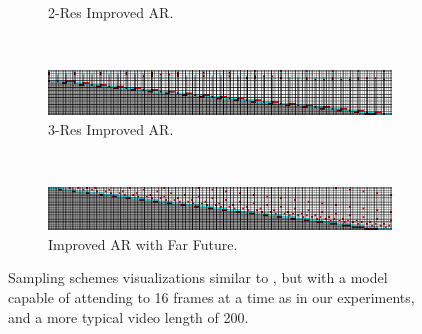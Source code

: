 \begin{figure}[t!]
\begin{subfigure}[t]{\textwidth}
        \caption{2-Res Improved AR.}
        \label{fig:2res-app}
    \end{subfigure}
    ~
    \begin{subfigure}[t]{\textwidth}
        \centering
        \includegraphics[width=\textwidth]{figures/big-sampling-scheme-visualizations/autoregressive-multires-15-5-1.png}
        \caption{3-Res Improved AR.}
        \label{fig:3res-app}
    \end{subfigure}
    ~
    \begin{subfigure}[t]{\textwidth}
        \centering
        \includegraphics[width=\textwidth]{figures/big-sampling-scheme-visualizations/autoregressive-with-future.png}
        \caption{Improved AR with Far Future.}
    \end{subfigure}
    \caption[A visualization of all sampling schemes.]{Sampling schemes visualizations similar to , but with a model capable of attending to 16 frames at a time as in our experiments, and a more typical video length of 200.
    }
    \label{fig:sampling-scheme-details}
\end{figure}


